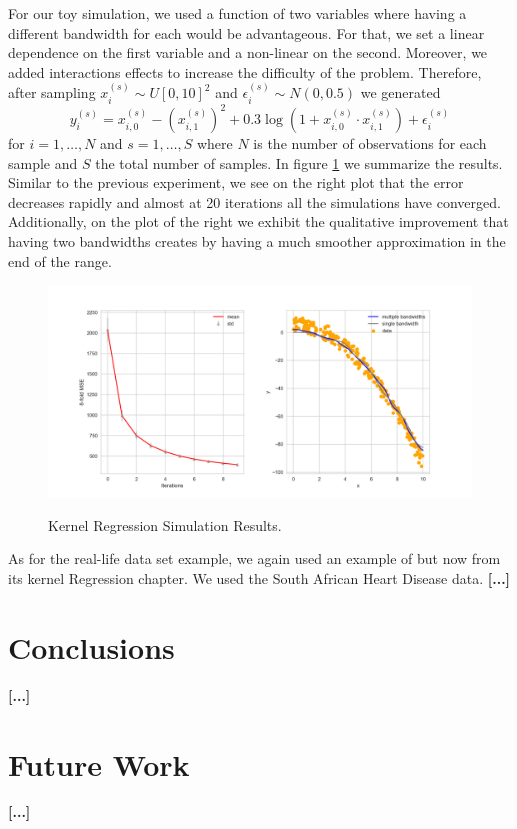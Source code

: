 \documentclass{article}
\begin{document}
For our toy simulation, we used a function of two variables where having a different
bandwidth for each would be advantageous. For that, we set a linear dependence on the first
variable and a non-linear on the second. Moreover, we added interactions effects to increase
the difficulty of the problem. Therefore, after sampling $x_i^{(s)} \sim U[0, 10]^2$ and
$\epsilon_i^{(s)} \sim N(0,0.5)$ we generated
$$
y_i^{(s)} =
x_{i,0}^{(s)} - \left( x_{i,1}^{(s)} \right)^{2} + 0.3 \log \left(1 + x_{i,0}^{(s)} \cdot
x_{i,1}^{(s)} \right) + \epsilon_i^{(s)}
$$
for $i=1, \dots, N$ and $s=1, \dots, S$ where $N$ is the number of observations for each
sample and $S$ the total number of samples. In figure \ref{krr} we summarize the results.
Similar to the previous experiment, we see on the right plot that the error decreases
rapidly and almost at 20 iterations all the simulations have converged. Additionally, on the
plot of the right we exhibit the qualitative improvement that having two bandwidths creates
by having a much smoother approximation in the end of the range.

\begin{figure}
  \centering
  \caption{Kernel Regression Simulation Results.}
  \includegraphics[width=\textwidth]{./pics/ker_reg_results.png}
  \label{krr}
\end{figure}

As for the real-life data set example, we again used an example of \citet{ESL} but now from
its kernel Regression chapter. We used the South African Heart Disease data. \textbf{[...]}

\citet{ADAfaEPoV}


\section{Conclusions}

\textbf{[...]}

\section{Future Work}

\textbf{[...]}


\end{document}
